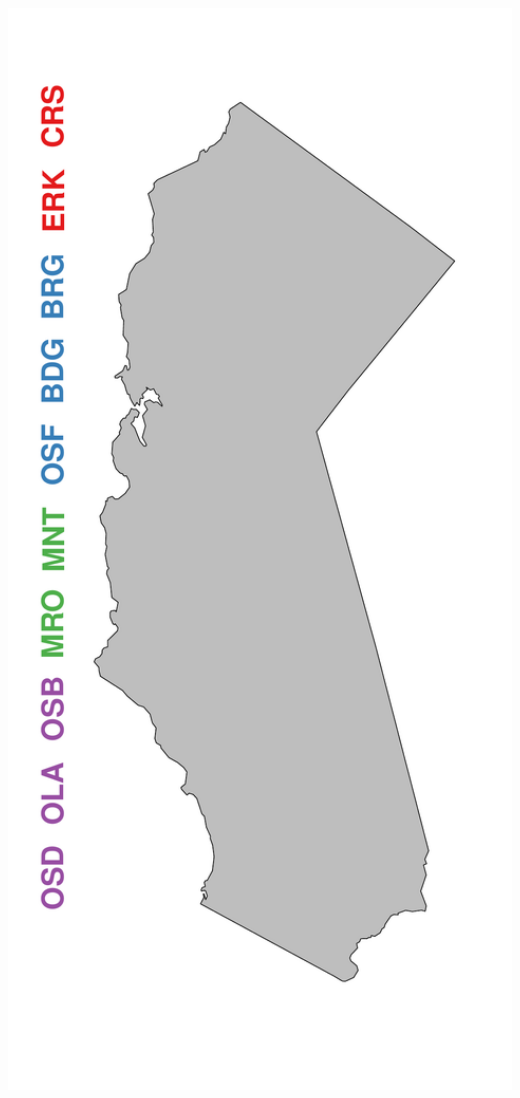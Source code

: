 \documentclass[ xcolor = pdftex, dvipsnames, table ]{beamer}
\begin{document}
\begin{frame}
{\begin{minipage}[h!]{0.19\textwidth}
\end{minipage}
\begin{minipage}[h!]{0.19\textwidth}
        \hspace*{0.25cm}
        \includegraphics[width=1.2\textwidth]{../pictures/mapFullConcMend.pdf}

\end{minipage}}
\end{frame}
\end{document}
